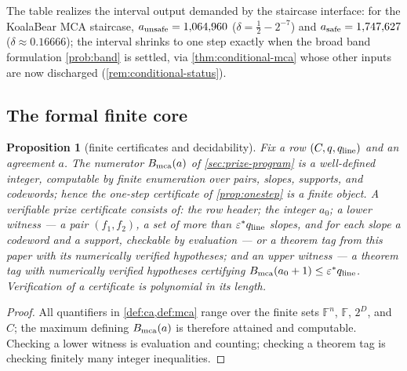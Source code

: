 \documentclass[11pt]{article}
\newtheorem{proposition}[proposition]{Proposition}
\theoremstyle{definition}
\theoremstyle{remark}
\newcommand{\F}{\mathbb{F}}
\begin{document}
The table realizes the interval output demanded by the staircase interface: for the KoalaBear MCA staircase, $a_{\rm unsafe}=1{,}064{,}960$ \textup($\delta=\frac12-2^{-7}$\textup) and $a_{\rm safe}=1{,}747{,}627$ \textup($\delta\approx0.16666$\textup); the interval shrinks to one step exactly when the broad band formulation \cref{prob:band} is settled, via \cref{thm:conditional-mca} whose other inputs are now discharged \textup(\cref{rem:conditional-status}\textup).

\subsection{The formal finite core}\label{sec:discharge-T7}

\begin{proposition}[finite certificates and decidability]\label{prop:finite-certificate}
Fix a row $(C,q,q_{\rm line})$ and an agreement $a$. The numerator $B_{\rm mca}(a)$ of \cref{sec:prize-program} is a well-defined integer, computable by finite enumeration over pairs, slopes, supports, and codewords; hence the one-step certificate of \cref{prop:onestep} is a finite object. A verifiable prize certificate consists of: the row header; the integer $a_0$; a \emph{lower witness} --- a pair $(f_1,f_2)$, a set of more than $\varepsilon^*q_{\rm line}$ slopes, and for each slope a codeword and a support, checkable by evaluation --- or a theorem tag from this paper with its numerically verified hypotheses; and an \emph{upper witness} --- a theorem tag with numerically verified hypotheses certifying $B_{\rm mca}(a_0+1)\le\varepsilon^*q_{\rm line}$. Verification of a certificate is polynomial in its length.
\end{proposition}

\begin{proof}
All quantifiers in \cref{def:ca,def:mca} range over the finite sets $\F^n$, $\F$, $2^D$, and $C$; the maximum defining $B_{\rm mca}(a)$ is therefore attained and computable. Checking a lower witness is evaluation and counting; checking a theorem tag is checking finitely many integer inequalities.
\end{proof}
\end{document}
